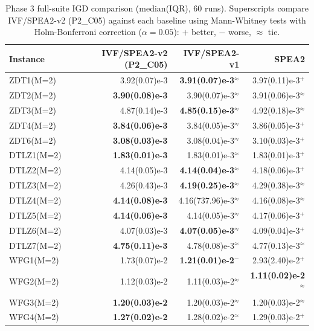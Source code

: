 \begin{table}[t]
\caption{Phase 3 full-suite IGD comparison (median(IQR), 60 runs). Superscripts compare IVF/SPEA2-v2 (P2\_C05) against each baseline using Mann-Whitney tests with Holm-Bonferroni correction ($\alpha=0.05$): $+$ better, $-$ worse, $\approx$ tie.}
\label{tab:ablation_v2_phase3_igd}
\centering\tiny
\setlength{\tabcolsep}{3pt}
\begin{tabular}{lrrr}
\toprule
Instance & IVF/SPEA2-v2 (P2\_C05) & IVF/SPEA2-v1 & SPEA2 \\
\midrule
ZDT1(M=2) & 3.92(0.07)e-3 & \textbf{3.91(0.07)e-3$^{\approx}$} & 3.97(0.11)e-3$^{+}$ \\
ZDT2(M=2) & \textbf{3.90(0.08)e-3} & 3.90(0.07)e-3$^{\approx}$ & 3.91(0.06)e-3$^{\approx}$ \\
ZDT3(M=2) & 4.87(0.14)e-3 & \textbf{4.85(0.15)e-3$^{\approx}$} & 4.92(0.18)e-3$^{\approx}$ \\
ZDT4(M=2) & \textbf{3.84(0.06)e-3} & 3.84(0.05)e-3$^{\approx}$ & 3.86(0.05)e-3$^{+}$ \\
ZDT6(M=2) & \textbf{3.08(0.03)e-3} & 3.08(0.04)e-3$^{\approx}$ & 3.10(0.03)e-3$^{+}$ \\
DTLZ1(M=2) & \textbf{1.83(0.01)e-3} & 1.83(0.01)e-3$^{\approx}$ & 1.83(0.01)e-3$^{+}$ \\
DTLZ2(M=2) & 4.14(0.05)e-3 & \textbf{4.14(0.04)e-3$^{\approx}$} & 4.18(0.06)e-3$^{+}$ \\
DTLZ3(M=2) & 4.26(0.43)e-3 & \textbf{4.19(0.25)e-3$^{\approx}$} & 4.29(0.38)e-3$^{\approx}$ \\
DTLZ4(M=2) & \textbf{4.14(0.08)e-3} & 4.16(737.96)e-3$^{\approx}$ & 4.16(0.08)e-3$^{\approx}$ \\
DTLZ5(M=2) & \textbf{4.14(0.06)e-3} & 4.14(0.05)e-3$^{\approx}$ & 4.17(0.06)e-3$^{+}$ \\
DTLZ6(M=2) & 4.07(0.03)e-3 & \textbf{4.07(0.05)e-3$^{\approx}$} & 4.09(0.04)e-3$^{+}$ \\
DTLZ7(M=2) & \textbf{4.75(0.11)e-3} & 4.78(0.08)e-3$^{\approx}$ & 4.77(0.13)e-3$^{\approx}$ \\
WFG1(M=2) & 1.73(0.07)e-2 & \textbf{1.21(0.01)e-2$^{-}$} & 2.93(2.40)e-2$^{+}$ \\
WFG2(M=2) & 1.12(0.03)e-2 & 1.11(0.03)e-2$^{\approx}$ & \textbf{1.11(0.02)e-2$^{\approx}$} \\
WFG3(M=2) & \textbf{1.20(0.03)e-2} & 1.20(0.03)e-2$^{\approx}$ & 1.20(0.03)e-2$^{\approx}$ \\
WFG4(M=2) & \textbf{1.27(0.02)e-2} & 1.28(0.02)e-2$^{\approx}$ & 1.29(0.03)e-2$^{+}$ \\

\end{tabular}
\end{table}
